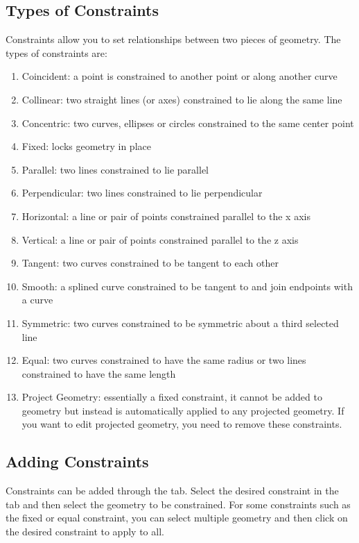 \cbend

\subsection{Types of Constraints}
\label{subchap:constraint-types}

\cbstart

Constraints allow you to set relationships between two pieces of geometry. The types of constraints are:

\begin{enumerate}
\item Coincident: a point is constrained to another point or along another curve
\item Collinear: two straight lines (or axes) constrained to lie along the same line
\item Concentric: two curves, ellipses or circles constrained to the same center point
\item Fixed: locks geometry in place
\item Parallel: two lines constrained to lie parallel
\item Perpendicular: two lines constrained to lie perpendicular
\item Horizontal: a line or pair of points constrained parallel to the x axis
\item Vertical: a line or pair of points constrained parallel to the z axis
\item Tangent: two curves constrained to be tangent to each other
\item Smooth: a splined curve constrained to be tangent to and join endpoints with a curve
\item Symmetric: two curves constrained to be symmetric about a third selected line
\item Equal: two curves constrained to have the same radius or two lines constrained to have the same length
\item Project Geometry: essentially a fixed constraint, it cannot be added to geometry but instead is automatically applied to any projected geometry. If you want to edit projected geometry, you need to remove these constraints.
\end{enumerate}

\cbend

\subsection{Adding Constraints}
\cbstart
Constraints can be added through the  tab. Select the desired constraint in the tab and then select the geometry to be constrained. For some constraints such as the fixed or equal constraint, you can select multiple geometry and then click on the desired constraint to apply to all.
\cbend
